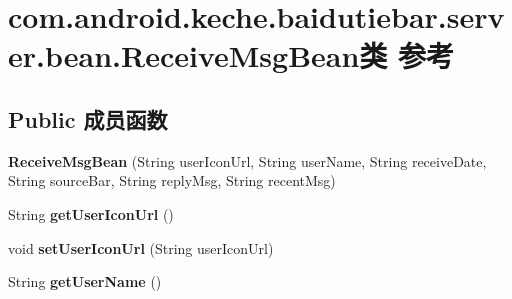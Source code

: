 \hypertarget{classcom_1_1android_1_1keche_1_1baidutiebar_1_1server_1_1bean_1_1_receive_msg_bean}{}\section{com.\+android.\+keche.\+baidutiebar.\+server.\+bean.\+Receive\+Msg\+Bean类 参考}
\label{classcom_1_1android_1_1keche_1_1baidutiebar_1_1server_1_1bean_1_1_receive_msg_bean}
\subsection*{Public 成员函数}
\begin{DoxyCompactItemize}
\item 
\mbox{\label{classcom_1_1android_1_1keche_1_1baidutiebar_1_1server_1_1bean_1_1_receive_msg_bean_a9a4b3f6b180496d61f149dcd58edf0f8}} 
{\bfseries Receive\+Msg\+Bean} (String user\+Icon\+Url, String user\+Name, String receive\+Date, String source\+Bar, String reply\+Msg, String recent\+Msg)
\item 
\mbox{\label{classcom_1_1android_1_1keche_1_1baidutiebar_1_1server_1_1bean_1_1_receive_msg_bean_ababc69fe68c1c754ce336af099bc61a6}} 
String {\bfseries get\+User\+Icon\+Url} ()
\item 
\mbox{\label{classcom_1_1android_1_1keche_1_1baidutiebar_1_1server_1_1bean_1_1_receive_msg_bean_a8e1ec1e3e3fba1e722aac970e4482362}} 
void {\bfseries set\+User\+Icon\+Url} (String user\+Icon\+Url)
\item 
\mbox{\label{classcom_1_1android_1_1keche_1_1baidutiebar_1_1server_1_1bean_1_1_receive_msg_bean_abccc11310fab34c6fb7fc46c9c45eb42}} 
String {\bfseries get\+User\+Name} ()
\item 
\mbox{\label{classcom_1_1android_1_1keche_1_1baidutiebar_1_1server_1_1bean_1_1_receive_msg_bean_aa4ee7ef60965ddff46ebbf44cb992b30}} 

\end{DoxyCompactItemize}
